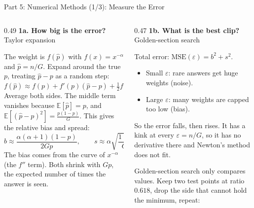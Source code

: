 \documentclass[aspectratio=169,10pt]{beamer}
\begin{document}
\begin{frame}{Part 5: Numerical Methods (1/3): Measure the Error}

\begin{columns}[T,onlytextwidth]
\begin{column}{0.49\textwidth}
\footnotesize
\textbf{1a. How big is the error?} \hfill \alert{Taylor expansion}

\smallskip
The weight is $f(\hat p)$ with $f(x)=x^{-\alpha}$ and $\hat p=n/G$. Expand around
the true $p$, treating $\hat p-p$ as a random step:
\[
  f(\hat p)\approx f(p)+f'(p)(\hat p-p)+\tfrac12 f''(p)(\hat p-p)^2 .
\]
Average both sides. The middle term vanishes because $\mathbb{E}[\hat p]=p$, and
$\mathbb{E}[(\hat p-p)^2]=\frac{p(1-p)}{G}$. This gives the relative bias and
spread:
\[
  b\approx\frac{\alpha(\alpha+1)(1-p)}{2Gp},\qquad
  s\approx\alpha\sqrt{\frac{1-p}{Gp}} .
\]
The bias comes from the curve of $x^{-\alpha}$ (the $f''$ term). Both shrink
with \alert{$Gp$}, the expected number of times the answer is seen.
\end{column}

\begin{column}{0.47\textwidth}
\footnotesize
\textbf{1b. What is the best clip?} \hfill \alert{Golden-section search}

\smallskip
Total error: $\text{MSE}(\varepsilon)=b^2+s^2$.
\begin{itemize}\setlength\itemsep{0pt}
  \item Small $\varepsilon$: rare answers get huge weights (noise).
  \item Large $\varepsilon$: many weights are capped too low (bias).
\end{itemize}
So the error falls, then rises. It has a kink at every $\varepsilon=n/G$, so it
has no derivative there and Newton's method does not fit.

\medskip
Golden-section search only compares values. Keep two test points at ratio
$0.618$, drop the side that cannot hold the minimum, repeat:

\centering
{}
\end{column}
\end{columns}
\end{frame}
\end{document}
